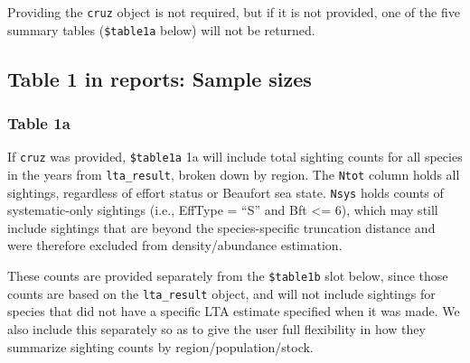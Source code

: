 \documentclass[
]{book}
\newenvironment{Shaded}{\begin{snugshade}}{\end{snugshade}}
\newcommand{\DataTypeTok}[1]{\textcolor[rgb]{0.13,0.29,0.53}{#1}}
\newcommand{\DecValTok}[1]{\textcolor[rgb]{0.00,0.00,0.81}{#1}}
\newcommand{\KeywordTok}[1]{\textcolor[rgb]{0.13,0.29,0.53}{\textbf{#1}}}
\newcommand{\NormalTok}[1]{#1}
\newcommand{\OperatorTok}[1]{\textcolor[rgb]{0.81,0.36,0.00}{\textbf{#1}}}
\newcommand{\StringTok}[1]{\textcolor[rgb]{0.31,0.60,0.02}{#1}}
\begin{document}
Providing the \texttt{cruz} object is not required, but if it is not provided, one of the five summary tables (\texttt{\$table1a} below) will not be returned.

\begin{Shaded}
\end{Shaded}

\hypertarget{table-1-in-reports-sample-sizes}{%
\subsection*{Table 1 in reports: Sample sizes}\label{table-1-in-reports-sample-sizes}}

\hypertarget{table-1a}{%
\subsubsection*{Table 1a}\label{table-1a}}

If \texttt{cruz} was provided, \texttt{\$table1a} 1a will include total sighting counts for all species in the years from \texttt{lta\_result}, broken down by region. The \texttt{Ntot} column holds all sightings, regardless of effort status or Beaufort sea state. \texttt{Nsys} holds counts of systematic-only sightings (i.e., EffType = ``S'' and Bft \textless= 6), which may still include sightings that are beyond the species-specific truncation distance and were therefore excluded from density/abundance estimation.

These counts are provided separately from the \texttt{\$table1b} slot below, since those counts are based on the \texttt{lta\_result} object, and will not include sightings for species that did not have a specific LTA estimate specified when it was made. We also include this separately so as to give the user full flexibility in how they summarize sighting counts by region/population/stock.

\begin{Shaded}
\end{Shaded}
\end{document}
